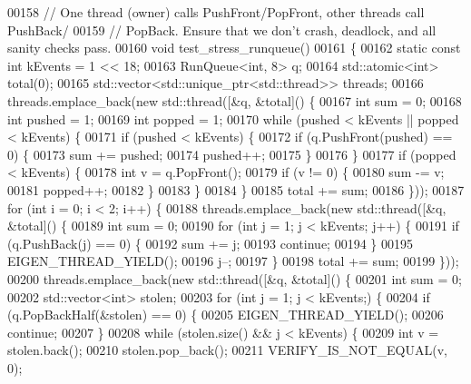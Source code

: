 \begin{DoxyCode}
00158 \textcolor{comment}{// One thread (owner) calls PushFront/PopFront, other threads call PushBack/}
00159 \textcolor{comment}{// PopBack. Ensure that we don't crash, deadlock, and all sanity checks pass.}
00160 \textcolor{keywordtype}{void} test\_stress\_runqueue()
00161 \{
00162   \textcolor{keyword}{static} \textcolor{keyword}{const} \textcolor{keywordtype}{int} kEvents = 1 << 18;
00163   RunQueue<int, 8> q;
00164   std::atomic<int> total(0);
00165   std::vector<std::unique\_ptr<std::thread>> threads;
00166   threads.emplace\_back(\textcolor{keyword}{new} std::thread([&q, &total]() \{
00167     \textcolor{keywordtype}{int} sum = 0;
00168     \textcolor{keywordtype}{int} pushed = 1;
00169     \textcolor{keywordtype}{int} popped = 1;
00170     \textcolor{keywordflow}{while} (pushed < kEvents || popped < kEvents) \{
00171       \textcolor{keywordflow}{if} (pushed < kEvents) \{
00172         \textcolor{keywordflow}{if} (q.PushFront(pushed) == 0) \{
00173           sum += pushed;
00174           pushed++;
00175         \}
00176       \}
00177       \textcolor{keywordflow}{if} (popped < kEvents) \{
00178         \textcolor{keywordtype}{int} v = q.PopFront();
00179         \textcolor{keywordflow}{if} (v != 0) \{
00180           sum -= v;
00181           popped++;
00182         \}
00183       \}
00184     \}
00185     total += sum;
00186   \}));
00187   \textcolor{keywordflow}{for} (\textcolor{keywordtype}{int} i = 0; i < 2; i++) \{
00188     threads.emplace\_back(\textcolor{keyword}{new} std::thread([&q, &total]() \{
00189       \textcolor{keywordtype}{int} sum = 0;
00190       \textcolor{keywordflow}{for} (\textcolor{keywordtype}{int} j = 1; j < kEvents; j++) \{
00191         \textcolor{keywordflow}{if} (q.PushBack(j) == 0) \{
00192           sum += j;
00193           \textcolor{keywordflow}{continue};
00194         \}
00195         EIGEN\_THREAD\_YIELD();
00196         j--;
00197       \}
00198       total += sum;
00199     \}));
00200     threads.emplace\_back(\textcolor{keyword}{new} std::thread([&q, &total]() \{
00201       \textcolor{keywordtype}{int} sum = 0;
00202       std::vector<int> stolen;
00203       \textcolor{keywordflow}{for} (\textcolor{keywordtype}{int} j = 1; j < kEvents;) \{
00204         \textcolor{keywordflow}{if} (q.PopBackHalf(&stolen) == 0) \{
00205           EIGEN\_THREAD\_YIELD();
00206           \textcolor{keywordflow}{continue};
00207         \}
00208         \textcolor{keywordflow}{while} (stolen.size() && j < kEvents) \{
00209           \textcolor{keywordtype}{int} v = stolen.back();
00210           stolen.pop\_back();
00211           VERIFY\_IS\_NOT\_EQUAL(v, 0);

\end{DoxyCode}
